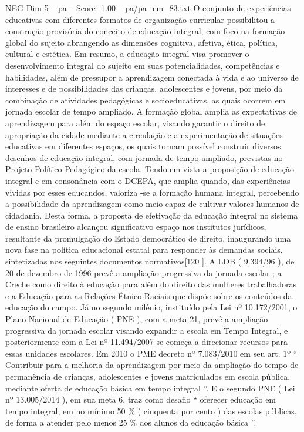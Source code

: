 \begin{textsample}{NEG Dim 5 – pa – Score -1.00 – pa/pa\_em\_83.txt}
O conjunto de experiências educativas com diferentes formatos de organização curricular possibilitou a construção provisória do conceito de educação integral, com foco na formação global do sujeito abrangendo as dimensões cognitiva, afetiva, ética, política, cultural e estética.
Em resumo, a educação integral visa promover o desenvolvimento integral do sujeito em suas potencialidades, competências e habilidades, além de pressupor a aprendizagem conectada à vida e ao universo de interesses e de possibilidades das crianças, adolescentes e jovens, por meio da combinação de atividades pedagógicas e socioeducativas, as quais ocorrem em jornada escolar de tempo ampliado.
A formação global amplia as expectativas de aprendizagem para além do espaço escolar, visando garantir o direito de apropriação da cidade mediante a circulação e a experimentação de situações educativas em diferentes espaços, os quais tornam possível construir diversos desenhos de educação integral, com jornada de tempo ampliado, previstas no Projeto Político Pedagógico da escola.
Tendo em vista a proposição de educação integral e em consonância com o DCEPA, que amplia quando, das experiências vividas por esses educandos, valoriza -se a formação humana integral, percebendo a possibilidade da aprendizagem como meio capaz de cultivar valores humanos de cidadania.
Desta forma, a proposta de efetivação da educação integral no sistema de ensino brasileiro alcançou significativo espaço nos institutos jurídicos, resultante da promulgação do Estado democrático de direito, inaugurando uma nova fase na política educacional estatal para responder às demandas sociais, sintetizadas nos seguintes documentos normativos[120 ].
A LDB ( 9.394/96 ), de 20 de dezembro de 1996 prevê a ampliação progressiva da jornada escolar ; a Creche como direito à educação para além do direito das mulheres trabalhadoras e a Educação para as Relações Étnico-Raciais que dispõe sobre os conteúdos da educação do campo.
Já no segundo milênio, instituído pela Lei nº 10.172/2001, o Plano Nacional de Educação ( PNE ), com a meta 21, prevê a ampliação progressiva da jornada escolar visando expandir a escola em Tempo Integral, e posteriormente com a Lei nº 11.494/2007 se começa a direcionar recursos para essas unidades escolares.
Em 2010 o PME decreto nº 7.083/2010 em seu art. 1º “ Contribuir para a melhoria da aprendizagem por meio da ampliação do tempo de permanência de crianças, adolescentes e jovens matriculados em escola pública, mediante oferta de educação básica em tempo integral ”.
E o segundo PNE ( Lei nº 13.005/2014 ), em sua meta 6, traz como desafio “ oferecer educação em tempo integral, em no mínimo 50 \% ( cinquenta por cento ) das escolas públicas, de forma a atender pelo menos 25 \% dos alunos da educação básica ”.

\end{textsample}
